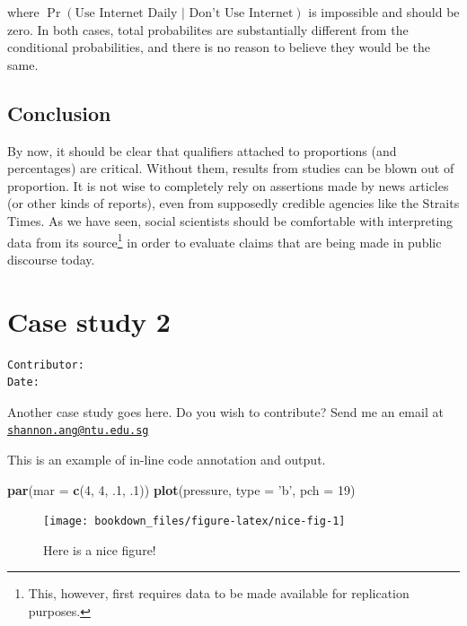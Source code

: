 \documentclass[openany]{book}
\newenvironment{Shaded}{\begin{snugshade}}{\end{snugshade}}
\newcommand{\KeywordTok}[1]{\textcolor[rgb]{0.13,0.29,0.53}{\textbf{#1}}}
\newcommand{\DataTypeTok}[1]{\textcolor[rgb]{0.13,0.29,0.53}{#1}}
\newcommand{\DecValTok}[1]{\textcolor[rgb]{0.00,0.00,0.81}{#1}}
\newcommand{\StringTok}[1]{\textcolor[rgb]{0.31,0.60,0.02}{#1}}
\newcommand{\NormalTok}[1]{#1}
\let\rmarkdownfootnote\footnote%
\def\footnote{\protect\rmarkdownfootnote}
\begin{document}
where \(\Pr(\text{Use Internet Daily } | \text{ Don't Use Internet})\)
is impossible and should be zero. In both cases, total probabilites are
substantially different from the conditional probabilities, and there is
no reason to believe they would be the same.

\section{Conclusion}\label{conclusion}

By now, it should be clear that qualifiers attached to proportions (and
percentages) are critical. Without them, results from studies can be
blown out of proportion. It is not wise to completely rely on assertions
made by news articles (or other kinds of reports), even from supposedly
credible agencies like the Straits Times. As we have seen, social
scientists should be comfortable with interpreting data from its
source\footnote{This, however, first requires data to be made available
  for replication purposes.} in order to evaluate claims that are being
made in public discourse today.

\chapter{Case study 2}\label{case2}

\begin{verbatim}
Contributor:
Date:
\end{verbatim}

Another case study goes here. Do you wish to contribute? Send me an
email at
\href{mailto:shannon.ang@ntu.edu.sg}{\nolinkurl{shannon.ang@ntu.edu.sg}}

This is an example of in-line code annotation and output.

\begin{Shaded}
\begin{Highlighting}[]
\KeywordTok{par}\NormalTok{(}\DataTypeTok{mar =} \KeywordTok{c}\NormalTok{(}\DecValTok{4}\NormalTok{, }\DecValTok{4}\NormalTok{, .}\DecValTok{1}\NormalTok{, .}\DecValTok{1}\NormalTok{))}
\KeywordTok{plot}\NormalTok{(pressure, }\DataTypeTok{type =} \StringTok{'b'}\NormalTok{, }\DataTypeTok{pch =} \DecValTok{19}\NormalTok{)}
\end{Highlighting}
\end{Shaded}

\begin{figure}

{\centering \texttt{[image: bookdown\_files/figure-latex/nice-fig-1]} 

}

\caption{Here is a nice figure!}\label{fig:nice-fig}
\end{figure}
\end{document}
